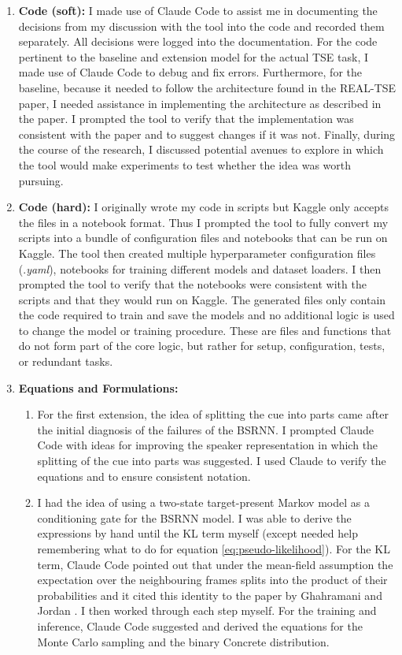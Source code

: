 \begin{enumerate}
    \item \label{ai:code-soft} \textbf{Code (soft):} I made use of Claude Code to assist me in documenting the decisions from my discussion with the tool into the code and recorded them separately. All decisions were logged into the documentation. For the code pertinent to the baseline and extension model for the actual TSE task, I made use of Claude Code to debug and fix errors. Furthermore, for the baseline, because it needed to follow the architecture found in the REAL-TSE paper, I needed assistance in implementing the architecture as described in the paper. I prompted the tool to verify that the implementation was consistent with the paper and to suggest changes if it was not. Finally, during the course of the research, I discussed potential avenues to explore in which the tool would make experiments to test whether the idea was worth pursuing. 
    \item \label{ai:code-hard} \textbf{Code (hard):} I originally wrote my code in scripts but Kaggle only accepts the files in a notebook format. Thus I prompted the tool to fully convert my scripts into a bundle of configuration files and notebooks that can be run on Kaggle. The tool then created multiple hyperparameter configuration files (.\textit{yaml}), notebooks for training different models and dataset loaders. I then prompted the tool to verify that the notebooks were consistent with the scripts and that they would run on Kaggle. The generated files only contain the code required to train and save the models and no additional logic is used to change the model or training procedure. These are files and functions that do not form part of the core logic, but rather for setup, configuration, tests, or redundant tasks.
    \item \label{ai:equations} \textbf{Equations and Formulations:}
    \begin{enumerate}
        \item \label{ai:eq-cue} For the first extension, the idea of splitting the cue into parts came after the initial diagnosis of the failures of the BSRNN. I prompted Claude Code with ideas for improving the speaker representation in which the splitting of the cue into parts was suggested. I used Claude to verify the equations and to ensure consistent notation.
        \item \label{ai:eq-gate} I had the idea of using a two-state target-present Markov model as a conditioning gate for the BSRNN model. I was able to derive the expressions by hand until the KL term myself (except needed help remembering what to do for equation \ref{eq:pseudo-likelihood}). For the KL term, Claude Code pointed out that under the mean-field assumption the expectation over the neighbouring frames splits into the product of their probabilities and it cited this identity to the paper by Ghahramani and Jordan \cite{ghahramani1997factorial}.  I then worked through each step myself. For the training and inference, Claude Code suggested and derived the equations for the Monte Carlo sampling and the binary Concrete distribution.

\end{enumerate}
\end{enumerate}
